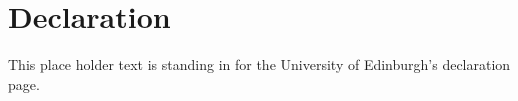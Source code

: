 \chapter{Declaration}

This place holder text is standing in for the University of Edinburgh's declaration page.